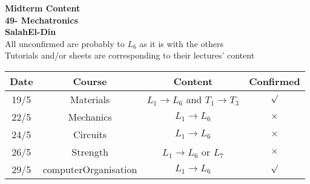 \documentclass[12pt]{article}
\begin{document}
\begin{center}
	\textbf{\LARGE Midterm Content
		\\
		\vspace{0.5cm}
		\Large 49- Mechatronics 
	}
	\\ 

\vspace{0.3cm}
\textbf{SalahEl-Din}
\\
\vspace{0.3cm}
All unconfirmed are probably to $L_6$ as it is with the others \\
Tutorials and/or sheets are corresponding to their lectures' content
\\
	\vspace{1cm}
\begin{tabular}{|c|c|c|c|}
	\hline
	Date&Course&Content&Confirmed\\
	\hline
	19/5 & Materials& $L_1 \to L_6$ and $ T_1 \to T_3$ & $\surd$ \\
	\hline
	22/5&Mechanics&$L_1 \to L_6$ & $\times$ \\
	\hline
	24/5& Circuits&$L_1 \to L_6$ & $\times$ \\
	\hline
	26/5&Strength& $L_1 \to L_6$ or $L_7$& $\times$\\
	\hline
	29/5&computerOrganisation& $L_1 \to L_6$ & $\surd$ \\
	\hline
\end{tabular}
\end{center}
\end{document}
